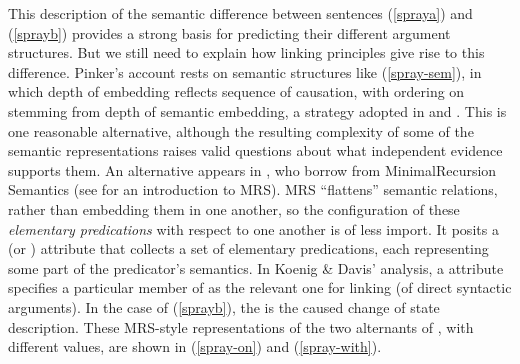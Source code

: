 \documentclass[output=paper
 	        ,biblatex
                ,babelshorthands
                ,newtxmath
                ,draftmode
                ,colorlinks, citecolor=brown
]{langscibook}
\begin{document}
This description of the semantic difference between sentences (\ref{spraya}) and (\ref{sprayb}) provides a strong basis for predicting their different argument structures.
But we still need to explain how linking principles give rise to this difference.
Pinker's account rests on semantic structures like (\ref{spray-sem}), in which depth of embedding reflects sequence of causation, with ordering on \argst stemming from depth of semantic embedding, a strategy adopted in \citet{Davis1996} and \citet{Davis2001}.
This is one reasonable alternative, although the resulting complexity of some of the semantic representations raises valid questions about what independent evidence supports them.
An alternative appears in \citet{KoenigandDavis2006}, who borrow from Minimal\indexmrs Recursion Semantics (see  for an introduction to MRS).
MRS ``flattens'' semantic relations, rather than embedding them in one another, so the configuration of these \emph{elementary predications} with respect to one another is of less import.
It posits a  (or \rels) attribute that collects a set of elementary predications, each representing some part of the predicator's semantics.
In Koenig \& Davis' analysis, a  attribute specifies a particular member of \rels as the relevant one for linking (of direct syntactic arguments).
In the case of (\ref{sprayb}), the  is the caused change of state description.
These MRS-style representations of the two alternants of , with different  values, are shown in (\ref{spray-on}) and (\ref{spray-with}).

\begin{exe}
\ex\label{spray-on}
\end{exe}

\begin{exe}\ex\label{spray-with}
\end{exe}                  
\end{document}
